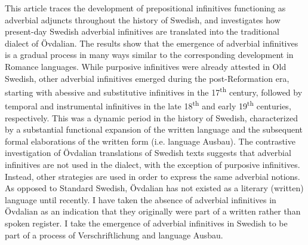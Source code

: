 \documentclass[output=paper]{langscibook}
\begin{document}
This article traces the development of prepositional infinitives functioning as adverbial adjuncts throughout the history of Swedish, and investigates how present-day Swedish adverbial infinitives are translated into the traditional dialect of Övdalian. The results show that the emergence of adverbial infinitives is a gradual process in many ways similar to the corresponding development in Romance languages. While purposive infinitives were already attested in Old Swedish, other adverbial infinitives emerged during the post-Reformation era, starting with abessive and substitutive infinitives in the 17\textsuperscript{th} century, followed by temporal and instrumental infinitives in the late 18\textsuperscript{th} and early 19\textsuperscript{th} centuries, respectively. This was a dynamic period in the history of Swedish, characterized by a substantial functional expansion of the written language and the subsequent formal elaborations of the written form (i.e. language Ausbau). The contrastive investigation of Övdalian translations of Swedish texts suggests that adverbial infinitives are not used in the dialect, with the exception of purposive infinitives. Instead, other strategies are used in order to express the same adverbial notions. As opposed to Standard Swedish, Övdalian has not existed as a literary (written) language until recently. I have taken the absence of adverbial infinitives in Övdalian as an indication that they originally were part of a written rather than spoken register. I take the emergence of adverbial infinitives in Swedish to be part of a process of Verschriftlichung and language Ausbau. 
\end{document}
